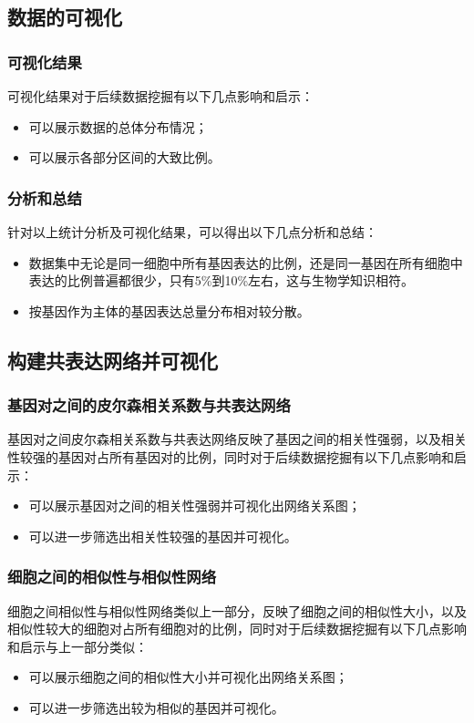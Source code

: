 \documentclass {article}
\begin{document}
	\subsection{数据的可视化}
		\subsubsection{可视化结果}
			可视化结果对于后续数据挖掘有以下几点影响和启示：
			\begin{itemize}
				\item 可以展示数据的总体分布情况；
				\item 可以展示各部分区间的大致比例。
			\end{itemize}
			
		\subsubsection{分析和总结}
			\label{分析和总结}
			针对以上统计分析及可视化结果，可以得出以下几点分析和总结：
			\begin{itemize}
				\item 数据集中无论是同一细胞中所有基因表达的比例，还是同一基因在所有细胞中表达的比例普遍都很少，只有5\%到10\%左右，这与生物学知识相符。
				\item 按基因作为主体的基因表达总量分布相对较分散。
			\end{itemize}
		
	\subsection{构建共表达网络并可视化}
		\subsubsection{基因对之间的皮尔森相关系数与共表达网络}
			基因对之间皮尔森相关系数与共表达网络反映了基因之间的相关性强弱，以及相关性较强的基因对占所有基因对的比例，同时对于后续数据挖掘有以下几点影响和启示：
			\begin{itemize}
				\item 可以展示基因对之间的相关性强弱并可视化出网络关系图；
				\item 可以进一步筛选出相关性较强的基因并可视化。
			\end{itemize}

		\subsubsection{细胞之间的相似性与相似性网络}
			细胞之间相似性与相似性网络类似上一部分，反映了细胞之间的相似性大小，以及相似性较大的细胞对占所有细胞对的比例，同时对于后续数据挖掘有以下几点影响和启示与上一部分类似：
			\begin{itemize}
				\item 可以展示细胞之间的相似性大小并可视化出网络关系图；
				\item 可以进一步筛选出较为相似的基因并可视化。
			\end{itemize}			
\end{document}
